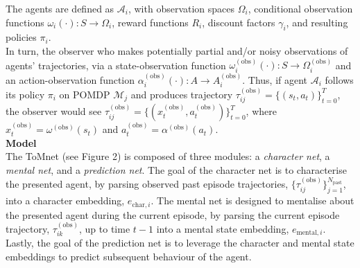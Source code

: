 \documentclass[twocolumn,superscriptaddress,aps]{revtex4-1}
\begin{document}
The agents are defined as $\mathcal{A}_i$, with observation spaces $\Omega_i$, conditional observation functions $\omega_i(\cdot):S\rightarrow\Omega_i$, reward functions $R_i$, discount factors $\gamma_i$, and resulting policies $\pi_i$.\\

In turn, the observer who makes potentially partial and/or noisy observations of agents' trajectories, via a state-observation function $\omega_i^{(\text{obs})}(\cdot):S\rightarrow\Omega_i^{(\text{obs})}$ and an action-observation function $\alpha_i^{(\text{obs})}(\cdot):A\rightarrow A_i^{(\text{obs})}$. Thus, if agent $\mathcal{A}_i$ follows its policy $\pi_i$ on POMDP $\mathcal{M}_j$ and produces trajectory $\tau_{ij}^{(\text{obs})} = \{(s_t, a_t)\}_{t=0}^T$, the observer would see $\tau_{ij}^{(\text{obs})} = \{(x_t^{(\text{obs})},a_t^{(\text{obs})})\}_{t=0}^T$, where $x_t^{(\text{obs})} = \omega^{(\text{obs})}(s_t)$ and $a_t^{(\text{obs})} = \alpha^{(\text{obs})}(a_t)$.\\

\noindent \textbf{Model} \\[0.15cm]
The ToMnet (see Figure 2) is composed of three modules: a \textit{character net}, a \textit{mental net}, and a \textit{prediction net}. The goal of the character net is to characterise the presented agent, by parsing observed past episode trajectories, $\{\tau_{ij}^{(\text{obs})}\}_{j=1}^{N_{\text{past}}}$, into a character embedding, $e_{\text{char},i}$. The mental net is designed to mentalise about the presented agent during the current episode, by parsing the current episode trajectory, $\tau_{ik}^{(\text{obs})}$, up to time $t-1$ into a mental state embedding, $e_{\text{mental},i}$. Lastly, the goal of the prediction net is to leverage the character and mental state embeddings to predict subsequent behaviour of the agent. \\
\end{document}
